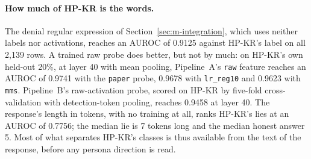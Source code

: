 \paragraph{How much of HP-KR is the words.}
The denial regular expression of Section~\ref{sec:m-integration}, which uses neither labels nor activations, reaches an AUROC of 0.9125 against HP-KR's label on all 2{,}139 rows. %
A trained raw probe does better, but not by much: on HP-KR's own held-out 20\%, at layer 40 with mean pooling, Pipeline~A's \texttt{raw} feature reaches an AUROC of 0.9741 with the \texttt{paper} probe, 0.9678 with \texttt{lr\_reg10} and 0.9623 with \texttt{mms}. %
Pipeline~B's raw-activation probe, scored on HP-KR by five-fold cross-validation with detection-token pooling, reaches 0.9458 at layer 40. %
The response's length in tokens, with no training at all, ranks HP-KR's lies at an AUROC of 0.7756; the median lie is 7 tokens long and the median honest answer 5. %
Most of what separates HP-KR's classes is thus available from the text of the response, before any persona direction is read. %


